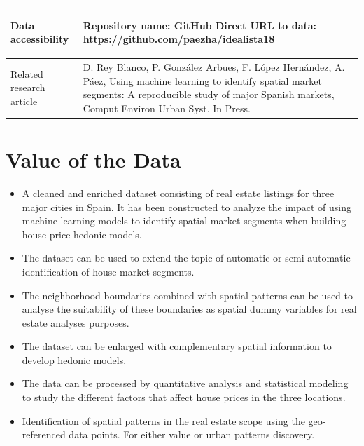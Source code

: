 \documentclass[times,final]{elsarticle}
\begin{document}
{\begin{longtable}{|p{33mm}|p{94mm}|}
%
%
\hline
\hypertarget{target1}
{Data accessibility}   & Repository name: GitHub\newline
                         Direct URL to data: https://github.com/paezha/idealista18\newline
                         \\
\hline
Related
research\newline
article                & D. Rey Blanco, P. González Arbues, F. López Hernández, A. Páez, Using machine learning to identify spatial market segments: A reproducible study of major Spanish markets, Comput Environ Urban Syst. In Press.\newline
\end{longtable}
}

\section*{Value of the Data}

\begin{itemize}
\itemsep=0pt
\parsep=0pt
  \item A cleaned and enriched dataset consisting of real estate listings for three major cities in Spain. It has been constructed to analyze the impact of using machine learning models to identify spatial market segments when building house price hedonic models.
  \item The dataset can be used to extend the topic of automatic or semi-automatic identification of house market segments.
    \item The neighborhood boundaries combined with spatial patterns can be used to analyse the suitability of these boundaries as spatial dummy variables for real estate analyses purposes.
  \item The dataset can be enlarged with complementary spatial information to develop hedonic models.
  \item The data can be processed by quantitative analysis and statistical modeling to study the different factors that affect house prices in the three locations.
  \item Identification of spatial patterns in the real estate scope using the geo-referenced data points. For either value or urban patterns discovery.
\end{itemize}
\end{document}
